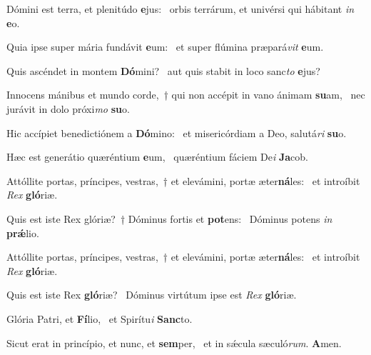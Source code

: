 \item Dómini est terra, et plenitúdo \textbf{e}jus:~\psstar{} orbis terrárum, et univérsi qui hábitant \textit{in} \textbf{e}o.
\item Quia ipse super mária fundávit \textbf{e}um:~\psstar{} et super flúmina præpará\textit{vit} \textbf{e}um.
\item Quis ascéndet in montem \textbf{Dó}mini?~\psstar{} aut quis stabit in loco sanc\textit{to} \textbf{e}jus?
\item Innocens mánibus et mundo corde,~† qui non accépit in vano ánimam \textbf{su}am,~\psstar{} nec jurávit in dolo próxi\textit{mo} \textbf{su}o.
\item Hic accípiet benedictiónem a \textbf{Dó}mino:~\psstar{} et misericórdiam a Deo, salutá\textit{ri} \textbf{su}o.
\item Hæc est generátio quæréntium \textbf{e}um,~\psstar{} quæréntium fáciem De\textit{i} \textbf{Ja}cob.
\item Attóllite portas, príncipes, vestras,~† et elevámini, portæ æter\textbf{ná}les:~\psstar{} et introíbit \textit{Rex} \textbf{gló}riæ.
\item Quis est iste Rex glóriæ?~† Dóminus fortis et \textbf{pot}ens:~\psstar{} Dóminus potens \textit{in} \textbf{prǽ}lio.
\item Attóllite portas, príncipes, vestras,~† et elevámini, portæ æter\textbf{ná}les:~\psstar{} et introíbit \textit{Rex} \textbf{gló}riæ.
\item Quis est iste Rex \textbf{gló}riæ?~\psstar{} Dóminus virtútum ipse est \textit{Rex} \textbf{gló}riæ.
\item Glória Patri, et \textbf{Fí}lio,~\psstar{} et Spirítu\textit{i} \textbf{Sanc}to.
\item Sicut erat in princípio, et nunc, et \textbf{sem}per,~\psstar{} et in sǽcula sæculó\textit{rum}. \textbf{A}men.
